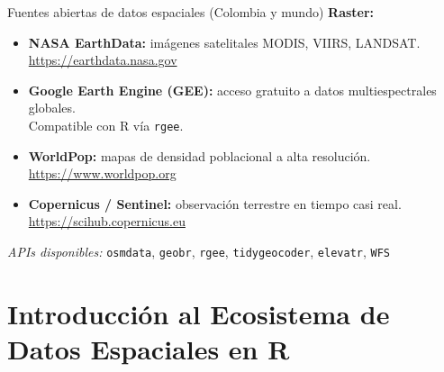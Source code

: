 \documentclass{beamer}
\begin{document}
\begin{frame}{Fuentes abiertas de datos espaciales (Colombia y mundo)}
\small
\textbf{Raster:}
\begin{itemize}
    \item \textbf{NASA EarthData:} imágenes satelitales MODIS, VIIRS, LANDSAT. \\
    \href{https://earthdata.nasa.gov}{https://earthdata.nasa.gov}
    
    \item \textbf{Google Earth Engine (GEE):} acceso gratuito a datos multiespectrales globales. \\
    Compatible con R vía \texttt{rgee}.

    \item \textbf{WorldPop:} mapas de densidad poblacional a alta resolución. \\
    \href{https://www.worldpop.org}{https://www.worldpop.org}
    
    \item \textbf{Copernicus / Sentinel:} observación terrestre en tiempo casi real. \\
    \href{https://scihub.copernicus.eu}{https://scihub.copernicus.eu}
\end{itemize}

\vspace{0.5em}
\textit{APIs disponibles:} \texttt{osmdata}, \texttt{geobr}, \texttt{rgee}, \texttt{tidygeocoder}, \texttt{elevatr}, \texttt{WFS}
\end{frame}

\section{Introducción al Ecosistema de Datos Espaciales en R}
\begin{frame}[noframenumbering]
\tableofcontents[currentsection]
\end{frame}
\end{document}
